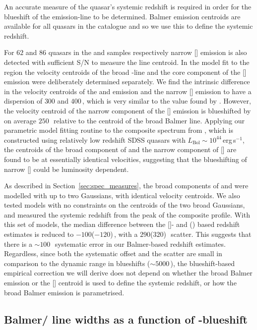 An accurate measure of the quasar's systemic redshift is required in order for the blueshift of the  emission-line to be determined.
Balmer emission centroids are available for all quasars in the catalogue and so we use this to define the systemic redshift.

For $62$ and $86$ quasars in the \ha and \hb samples respectively narrow [] emission is also detected with sufficient S/N to measure the line centroid.
In the model fit to the \hb region the velocity centroids of the broad \hbns-line and the core component of the [] emission were deliberately determined separately.
We find the intrinsic difference in the velocity centroids of the \ha and \hb emission and the narrow [] emission to have a dispersion of $300$ and $400$\,\kms, which is very similar to the value found by \citet{shen16b}.
However, the velocity centroid of the narrow component of the [] emission is blueshifted by on average $250$\,\kms\, relative to the centroid of the broad Balmer line.
Applying our parametric model fitting routine to the composite spectrum from \citet{hewett10}, which is constructed using relatively low redshift SDSS quasars with $L_{\text{Bol}}\sim10^{44}$\,erg\,s$^{-1}$, the centroids of the broad component of \hb and the narrow component of [] are found to be at essentially identical velocities, suggesting that the blueshifting of narrow [] could be luminosity dependent.

As described in Section~\ref{sec:spec_measures}, the broad components of \ha and \hb were modelled with up to two Gaussians, with identical velocity centroids.
We also tested models with no constraints on the centroids of the two broad Gaussians, and measured the systemic redshift from the peak of the composite profile.
With this set of models, the median difference between the []- and \hans(\hbns) based redshift estimates is reduced to $-100$($-120$)\,\kms, with a $290$($320$)\,\kms\, scatter.
This suggests that there is a $\sim100$\,\kms\, systematic error in our Balmer-based redshift estimates.
Regardless, since both the systematic offset and the scatter are small in comparison to the dynamic range in  blueshifts ($\sim5000$\,\kms), the blueshift-based empirical correction we will derive does not depend on whether the broad Balmer emission or the [] centroid is used to define the systemic redshift, or how the broad Balmer emission is parametrised.

\subsection{Balmer/ line widths as a function of -blueshift}
\label{sec:correction}

